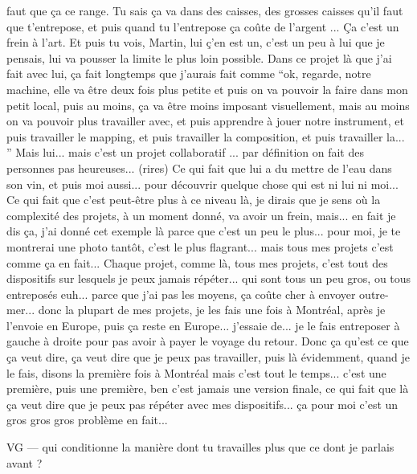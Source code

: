 faut que ça ce range. Tu sais ça va dans des caisses, des grosses caisses qu'il faut que t'entrepose, et puis quand tu l'entrepose ça coûte de l'argent ... Ça c'est un frein à l'art. Et puis tu vois, Martin, lui ç'en est un, c'est un peu à lui que je pensais, lui va pousser la limite le plus loin possible. Dans ce projet là que j'ai fait avec lui, ça fait longtemps que j'aurais fait comme ``ok, regarde, notre machine, elle va être deux fois plus petite et puis on va pouvoir la faire dans mon petit local, puis au moins, ça va être moins imposant visuellement, mais au moins on va pouvoir plus travailler avec, et puis apprendre à jouer notre instrument, et puis travailler le mapping, et puis travailler la composition, et puis travailler la... '' Mais lui... mais c'est un projet collaboratif ...  par définition on fait des personnes pas heureuses... (rires) Ce qui fait que lui a du mettre de l'eau dans son vin, et puis moi aussi... pour découvrir quelque chose qui est ni lui ni moi... Ce qui fait que c'est peut-être plus à ce niveau là, je dirais que je sens où la complexité des projets, à un moment donné, va avoir un frein, mais... en fait je dis ça, j'ai donné cet exemple là parce que c'est un peu le plus... pour moi, je te montrerai une photo tantôt, c'est le plus flagrant... mais tous mes projets c'est comme ça en fait... Chaque projet, comme là, tous mes projets, c'est tout des dispositifs sur lesquels je peux jamais répéter... qui sont tous un peu gros, ou tous entreposés euh... parce que j'ai pas les moyens, ça coûte cher à envoyer outre-mer...  donc la plupart de mes projets, je les fais une fois à Montréal, après je l'envoie en Europe, puis ça reste en Europe... j'essaie de... je le fais entreposer à gauche à droite pour pas avoir à payer le voyage du retour. Donc ça qu'est ce que ça veut dire, ça veut dire que je peux pas travailler, puis là évidemment, quand je le fais, disons la première fois à Montréal mais c'est tout le temps... c'est une première, puis une première, ben c'est jamais une version finale, ce qui fait que là ça veut dire que je peux pas répéter avec mes dispositifs... ça pour moi c'est un gros gros gros problème en fait... 

VG — qui conditionne la manière dont tu travailles plus que ce dont je parlais avant ?

